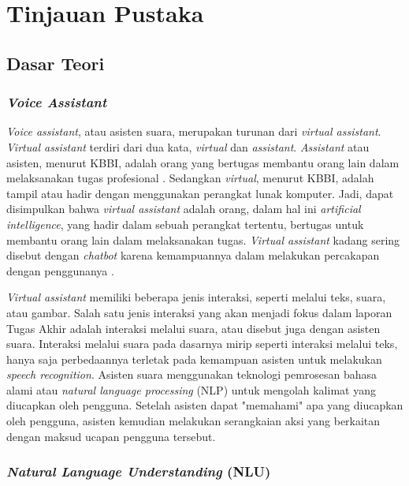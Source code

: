 \chapter{Tinjauan Pustaka}

\section{Dasar Teori}

\subsection{\textit{Voice Assistant}}

\textit{Voice assistant}, atau asisten suara, merupakan turunan dari \textit{virtual assistant}. \textit{Virtual assistant} terdiri dari dua kata, \textit{virtual} dan \textit{assistant}. \textit{Assistant} atau asisten, menurut KBBI, adalah orang yang bertugas membantu orang lain dalam melaksanakan tugas profesional \parencite{kbbi}. Sedangkan \textit{virtual}, menurut KBBI, adalah tampil atau hadir dengan menggunakan perangkat lunak komputer. Jadi, dapat disimpulkan bahwa \textit{virtual assistant} adalah orang, dalam hal ini \textit{artificial intelligence}, yang hadir dalam sebuah perangkat tertentu, bertugas untuk membantu orang lain dalam melaksanakan tugas. \textit{Virtual assistant} kadang sering disebut dengan \textit{chatbot} karena kemampuannya dalam melakukan percakapan dengan penggunanya \parencite{tech2005imbot}.

\textit{Virtual assistant} memiliki beberapa jenis interaksi, seperti melalui teks, suara, atau gambar. Salah satu jenis interaksi yang akan menjadi fokus dalam laporan Tugas Akhir adalah interaksi melalui suara, atau disebut juga dengan asisten suara. Interaksi melalui suara pada dasarnya mirip seperti interaksi melalui teks, hanya saja perbedaannya terletak pada kemampuan asisten untuk melakukan \textit{speech recognition}. Asisten suara menggunakan teknologi pemrosesan bahasa alami atau \textit{natural language processing} (NLP) untuk mengolah kalimat yang diucapkan oleh pengguna. Setelah asisten dapat "memahami" apa yang diucapkan oleh pengguna, asisten kemudian melakukan serangkaian aksi yang berkaitan dengan maksud ucapan pengguna tersebut.

\subsection{\textit{Natural Language Understanding} (NLU)}

